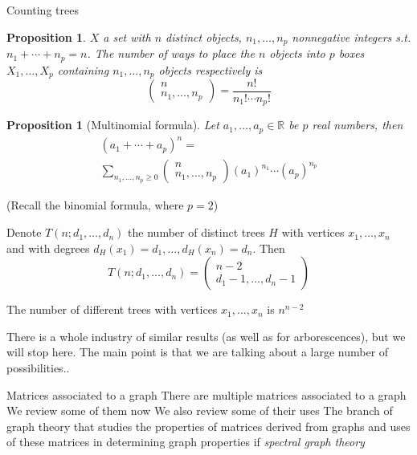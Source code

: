 \documentclass[aspectratio=43]{beamer}
\def\IR{\mathbb{R}}
\newtheorem{proposition}[theorem]{Proposition}
\begin{document}
\begin{frame}{Counting trees}
\begin{proposition}
$X$ a set with $n$ distinct objects, $n_1,\ldots,n_p$ nonnegative integers s.t. $n_1+\cdots+n_p=n$. The number of ways to place the $n$ objects into $p$ boxes $X_1,\ldots,X_p$ containing $n_1,\ldots,n_p$ objects respectively is 
\[
	\begin{pmatrix}
		n\\ n_1,\ldots,n_p
	\end{pmatrix}
	=
	\frac{n!}{n_1!\cdots n_p!}
\]
\end{proposition}
\vfill
\begin{proposition}[Multinomial formula]
Let $a_1,\ldots,a_p\in\IR$ be $p$ real numbers, then
\begin{multline*}
	(a_1+\cdots+a_p)^n= \\
	\sum_{n_1,\ldots,n_p\geq 0}
	\begin{pmatrix}
		n\\ n_1,\ldots,n_p
	\end{pmatrix}
	(a_1)^{n_1}\cdots(a_p)^{n_p}	
\end{multline*}
\end{proposition}
(Recall the binomial formula, where $p=2$)
\end{frame}


\begin{frame}
\begin{theorem}
Denote $T(n;d_1,\ldots,d_n)$ the number of distinct trees $H$ with vertices $x_1,\ldots,x_n$ and with degrees $d_H(x_1)=d_1,\ldots,d_H(x_n)=d_n$. Then
\[
	T(n;d_1,\ldots,d_n) = 
	\begin{pmatrix}
		n-2 \\
		d_1-1,\ldots,d_n-1
	\end{pmatrix}
\]
\end{theorem}
\vfill
\begin{theorem}
The number of different trees with vertices $x_1,\ldots,x_n$ is 
$n^{n-2}$
\end{theorem}
\vfill
There is a whole industry of similar results (as well as for arborescences), but we will stop here. The main point is that we are talking about a large number of possibilities..
\end{frame}


\begin{frame}{Matrices associated to a graph}
	There are multiple matrices associated to a graph
	\vfill
	We review some of them now
	\vfill
	We also review some of their uses
	\vfill
	The branch of graph theory that studies the properties of matrices derived from graphs and uses of these matrices in determining graph properties if \emph{spectral graph theory}
\end{frame}
\end{document}
